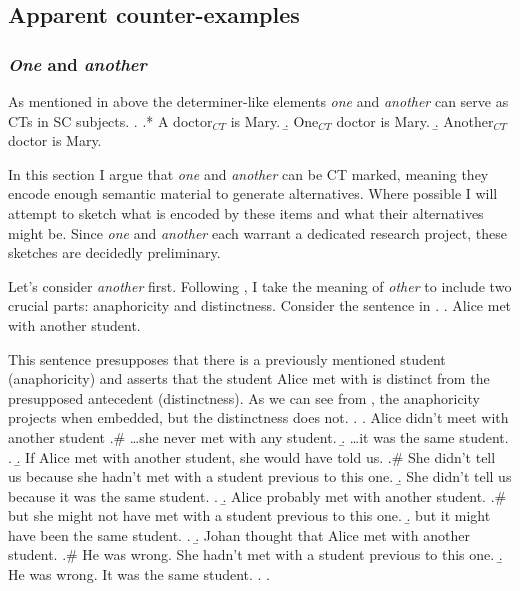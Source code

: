 \documentclass[letterpaper]{article}
\begin{document}
\subsection{Apparent counter-examples}
\subsubsection{\textit{One} and \textit{another}}
As mentioned in above the determiner-like elements \textit{one} and \textit{another} can serve as CTs in SC subjects.
\ex.\label{ex:AONeAnother}
\a.* A doctor$_{CT}$ is Mary.
\b.\label{ex:OneCT} One$_{CT}$ doctor is Mary.
\b.\label{ex:AnotherCT} Another$_{CT}$ doctor is Mary.

In this section I argue that \textit{one} and \textit{another} can be CT marked, meaning they encode enough semantic material to generate alternatives.
Where possible I will attempt to sketch what is encoded by these items and what their alternatives might be.
Since \textit{one} and \textit{another} each warrant a dedicated research project, these sketches are decidedly preliminary.

Let's consider \textit{another} first.
Following \textcite{heim1991reciprocity}, I take the meaning of  \textit{other} to include two crucial parts: anaphoricity and distinctness.
Consider the sentence in \Next.
\ex. Alice met with another student.

This sentence presupposes that there is a previously mentioned student (anaphoricity) and asserts that the student Alice met with is distinct from the presupposed antecedent (distinctness). 
As we can see from \Next, the anaphoricity projects when embedded, but the distinctness does not.
\ex.
\a. Alice didn't meet with another student
\a.\# \dots she never met with any student.
\b. \dots it was the same student.
\z.
\b. If Alice met with another student, she would have told us.
\a.\# She didn't tell us because she hadn't met with a student previous to this one.
\b. She didn't tell us because it was the same student.
\z.
\b. Alice probably met with another student.
\a.\# but she might not have met with a student previous to this one.
\b. but it might have been the same student. 
\z.
\b. Johan thought that Alice met with another student.
\a.\# He was wrong. She hadn't met with a student previous to this one.
\b. He was wrong. It was the same student.
\z.
\z.
\end{document}
